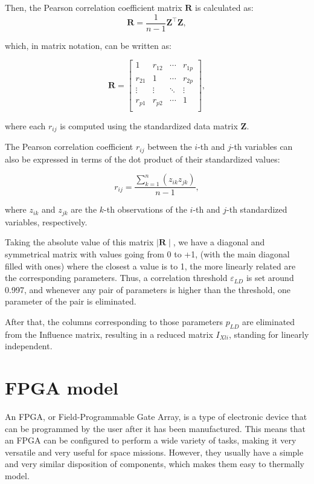 Then, the Pearson correlation coefficient matrix \( \mathbf{R} \) is calculated as:
   \[
   \mathbf{R} = \frac{1}{n-1} \mathbf{Z}^\top \mathbf{Z}, 
   \]

which, in matrix notation, can be written as:

\[
\mathbf{R} = \left[ \begin{array}{cccc}
1 & r_{12} & \cdots & r_{1p} \\
r_{21} & 1 & \cdots & r_{2p} \\
\vdots & \vdots & \ddots & \vdots \\
r_{p1} & r_{p2} & \cdots & 1 \\
\end{array} \right],
\]

where each \( r_{ij} \) is computed using the standardized data matrix \( \mathbf{Z} \).

The Pearson correlation coefficient \( r_{ij} \) between the \( i \)-th and \( j \)-th variables can also be expressed in terms of the dot product of their standardized values:

\[
r_{ij} = \frac{\sum_{k=1}^{n} (z_{ik} z_{jk})}{n-1},
\]

where \( z_{ik} \) and \( z_{jk} \) are the \( k \)-th observations of the \( i \)-th and \( j \)-th standardized variables, respectively.

Taking the absolute value of this matrix $\mid \mathbf{R}\mid$, we have a diagonal and symmetrical matrix with values going from 0 to +1, (with the main diagonal filled with ones) where the closest a value is to 1, the more linearly related are the corresponding parameters. Thus, a correlation threshold $\varepsilon_{LD}$ is set around 0.997, and whenever any pair of parameters is higher than the threshold, one parameter of the pair is eliminated.  

After that, the columns corresponding to those parameters $p_{LD}$ are eliminated from the Influence matrix, resulting in a reduced matrix $I_{Xli}$, standing for linearly independent.


\section{FPGA model}

An FPGA, or Field-Programmable Gate Array, is a type of electronic device that can be programmed by the user after it has been manufactured. This means that an FPGA can be configured to perform a wide variety of tasks, making it very versatile and very useful for space missions. However, they usually have a simple and very similar disposition of components, which makes them easy to thermally model.

